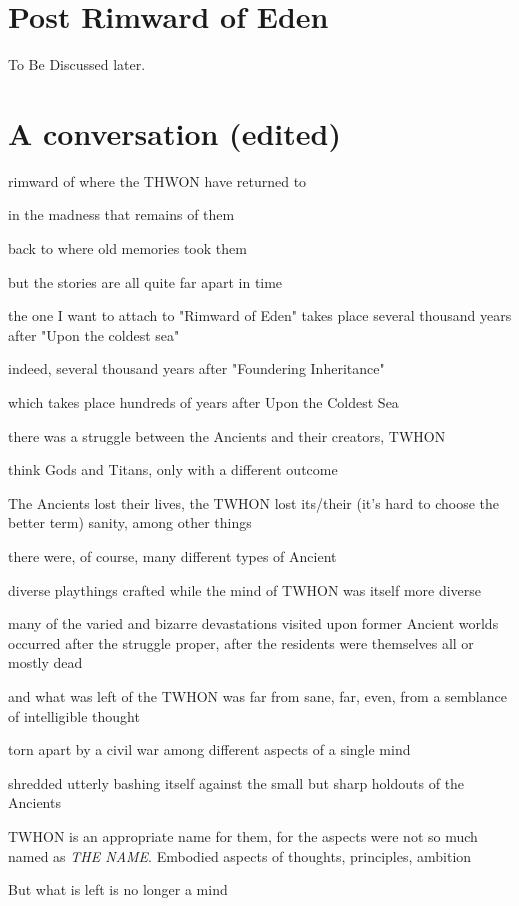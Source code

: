 \section{Post Rimward of Eden}
To Be Discussed later.

\section{A conversation (edited)}

rimward of where the THWON have returned to

in the madness that remains of them

back to where old memories took them

but the stories are all quite far apart in time

the one I want to attach to "Rimward of Eden" takes place several thousand years after "Upon the coldest sea"

indeed, several thousand years after "Foundering Inheritance"

which takes place hundreds of years after Upon the Coldest Sea

there was a struggle between the Ancients and their creators, TWHON

think Gods and Titans, only with a different outcome

The Ancients lost their lives, the TWHON lost its/their (it's hard to choose the better term) sanity, among other things

there were, of course, many different types of Ancient

diverse playthings crafted while the mind of TWHON was itself more diverse

many of the varied and bizarre devastations visited upon former Ancient worlds occurred after the struggle proper, after the residents were themselves all or mostly dead

and what was left of the TWHON was far from sane, far, even, from a semblance of intelligible thought

torn apart by a civil war among different aspects of a single mind

shredded utterly bashing itself against the small but sharp holdouts of the Ancients

TWHON is an appropriate name for them, for the aspects were not so much named as {\em THE NAME}. Embodied aspects of thoughts, principles, ambition

But what is left is no longer a mind

